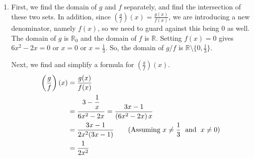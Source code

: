 \begin{example}
\begin{enumerate}
\item  First, we  find the domain of $g$ and $f$ separately, and find the intersection of these two sets.  In addition, since $\left(\frac{g}{f}\right)(x) = \frac{g(x)}{f(x)}$, we are introducing a new denominator, namely $f(x)$, so we need to guard against this being $0$ as well.  The domain of $g$ is $\mathbb{R}_0$ and the domain of $f$ is $\mathbb{R}$.  Setting $f(x) = 0$ gives $6x^2 - 2x = 0$ or $x = 0$ or $x=\frac{1}{3}$.  So, the domain of $g/f$ is $\mathbb{R}\setminus \{0,\tfrac{1}{3}\}$.

Next, we find and simplify a formula for $\left(\frac{g}{f}\right)(x)$.
\renewcommand{\arraystretch}{2.5}
 \allowdisplaybreaks
 \begin{align*}
\left( \dfrac{g}{f}\right)(x) & =  \dfrac{g(x)}{f(x)}\\
    & =  \dfrac{3-\dfrac{1}{x}\vphantom{\left(\dfrac{1}{x}\right)}}{6x^2 - 2x}=\dfrac{3x-1}{\left(6x^2 - 2x\right)x}  \\
	& =  \dfrac{3x-1}{2x^2(3x-1)} \qquad (\text{Assuming }x\neq\frac{1}{3}\; \text{ and } \; x \neq 0) \\
	& =  \dfrac{1}{2x^2}  
\end{align*}
\renewcommand{\arraystretch}{1}
\end{enumerate}
\end{example}

